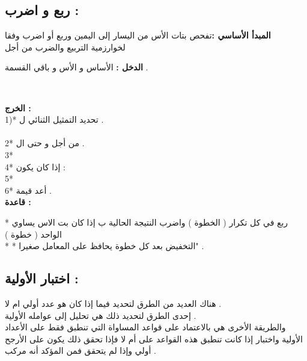 \documentclass[11pt,a4paper]{report}
\begin{document}
\begin{otherlanguage}{arabic}
\begin{otherlanguage}{arabic}
\begin{center}
\begin{otherlanguage}{arabic}
\begin{center}
\chapter{ربع و اضرب :}
\begin{otherlanguage}{arabic}
\begin{center}
\textbf{المبدأ الأساسي :}تفحص بتات الأس من اليسار إلى اليمين وربع أو اضرب وفقا  
لخوارزمية التربيع والضرب من أجل
\textit{ }
\\
\begin{flushleft}
\textbf{الدخل : }الأساس  و الأس  و باقي القسمة  .
\end{flushleft}
\\
\begin{flushleft}
\textbf{الخرج :} \textit{}
\\
1)* تحديد التمثيل الثنائي ل  .
\\
\textit{}
\\
2* من أجل \textit{} و حتى ال  .
\\
3* \textit{}
\\
4* إذا كان \textit{  } يكون :
\\
5* \textit{ }
\\
6* أعد قيمة  .
\\
\textbf{قاعدة :}
\end{flushleft}
* ربع في كل تكرار ( الخطوة   ) واضرب النتيجة الحالية ب  إذا كان بت الاس  يساوي الواحد ( خطوة  )
\\ *
* التخفيض بعد كل خطوة يحافظ على المعامل  صغيرا" .
\chapter{اختبار الأولية :}
\begin{otherlanguage}{arabic}
\begin{center}
هناك العديد من الطرق لتحديد فيما إذا كان \textit{} هو عدد أولي ام لا .
\\
إحدى الطرق لتحديد ذلك  هي تحليل\textit{ } إلى عوامله الأولية .
\\ 
والطريقة الأخرى هي بالاعتماد على  قواعد المساواة التي تنطبق فقط على الأعداد الأولية 
واختبار إذا كانت تنطبق هذه القواعد على \textit{} أم لا فإذا تحقق ذلك يكون
\textit{ } على الأرجح أولي 
وإذا لم يتحقق فمن المؤكد أنه مركب .
\\







\end{center}
\end{otherlanguage}
\end{center}
\end{otherlanguage}
\end{center}
\end{otherlanguage}
\end{center}
\end{otherlanguage}
\end{otherlanguage}
\end{document}
